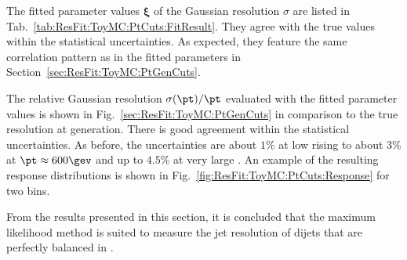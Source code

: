 The fitted parameter values $\mathbf{\xi}$ of the Gaussian resolution $\sigma$ are listed in Tab.~\ref{tab:ResFit:ToyMC:PtCuts:FitResult}.
They agree with the true values within the statistical uncertainties.
As expected, they feature the same correlation pattern as in the
fitted parameters in Section~\ref{sec:ResFit:ToyMC:PtGenCuts}.

The relative Gaussian resolution $\sigma(\pt)/\pt$ evaluated with the fitted parameter values is shown in Fig.~\ref{sec:ResFit:ToyMC:PtGenCuts} in comparison to the true resolution at generation.
There is good agreement within the statistical uncertainties.
As before, the uncertainties are about $1\%$ at low \pt rising to about $3\%$ at $\pt \approx 600\gev$ and up to $4.5\%$ at very large \pt.
An example of the resulting response distributions is shown in
Fig.~\ref{fig:ResFit:ToyMC:PtCuts:Response} for two \pttrue bins.

From the results presented in this section, it is concluded that the
maximum likelihood method is suited to measure the jet \pt resolution
of dijets that are perfectly balanced in \pttrue.